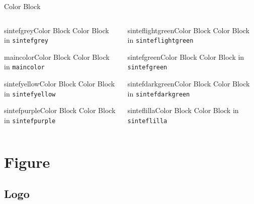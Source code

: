 \documentclass{beamer}
\begin{document}
\begin{frame}[fragile]{Color Block}
\begin{columns}
\begin{column}{0.45\textwidth}
\begin{colorblock}[black]{sintefgrey}{Color Block}
Color Block in \texttt{sintefgrey}
\end{colorblock}
\begin{colorblock}[white]{maincolor}{Color Block}
Color Block in \texttt{maincolor}
\end{colorblock}
\begin{colorblock}[white]{sintefyellow}{Color Block}
Color Block in \texttt{sintefyellow}
\end{colorblock}
\begin{colorblock}[white]{sintefpurple}{Color Block}
Color Block in \texttt{sintefpurple}
\end{colorblock}
\end{column}
\begin{column}{0.45\textwidth}
\begin{colorblock}[black]{sinteflightgreen}{Color Block}
Color Block in \texttt{sinteflightgreen}
\end{colorblock}
\begin{colorblock}[white]{sintefgreen}{Color Block}
Color Block in \texttt{sintefgreen}
\end{colorblock}
\begin{colorblock}[white]{sintefdarkgreen}{Color Block}
Color Block in \texttt{sintefdarkgreen}
\end{colorblock}
\begin{colorblock}[white]{sinteflilla}{Color Block}
Color Block in \texttt{sinteflilla}
\end{colorblock}
\end{column}
\end{columns}
\end{frame}


\section{Figure}


\subsection{Logo}
\end{document}
